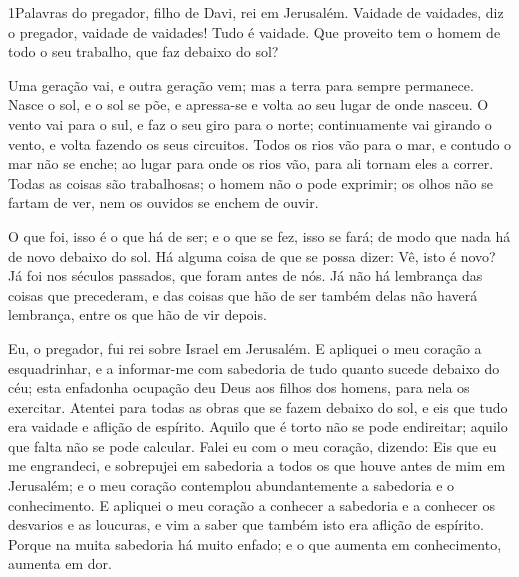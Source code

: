 
\lettrine{1} Palavras do pregador, filho de Davi, rei em
Jerusalém. Vaidade de vaidades, diz o pregador, vaidade de
vaidades! Tudo é vaidade. Que proveito tem o homem de todo o seu
trabalho, que faz debaixo do sol?

Uma geração vai, e outra geração vem; mas a terra para sempre
permanece. Nasce o sol, e o sol se põe, e apressa-se e volta ao
seu lugar de onde nasceu. O vento vai para o sul, e faz o seu
giro para o norte; continuamente vai girando o vento, e volta
fazendo os seus circuitos. Todos os rios vão para o mar, e
contudo o mar não se enche; ao lugar para onde os rios vão, para ali
tornam eles a correr. Todas as coisas são trabalhosas; o homem
não o pode exprimir; os olhos não se fartam de ver, nem os ouvidos
se enchem de ouvir.

O que foi, isso é o que há de ser; e o que se fez, isso se fará;
de modo que nada há de novo debaixo do sol. Há alguma coisa
de que se possa dizer: Vê, isto é novo? Já foi nos séculos passados,
que foram antes de nós. Já não há lembrança das coisas que
precederam, e das coisas que hão de ser também delas não haverá
lembrança, entre os que hão de vir depois.

Eu, o pregador, fui rei sobre Israel em Jerusalém. E
apliquei o meu coração a esquadrinhar, e a informar-me com sabedoria
de tudo quanto sucede debaixo do céu; esta enfadonha ocupação deu
Deus aos filhos dos homens, para nela os exercitar. Atentei
para todas as obras que se fazem debaixo do sol, e eis que tudo era
vaidade e aflição de espírito. Aquilo que é torto não se pode
endireitar; aquilo que falta não se pode calcular. Falei eu
com o meu coração, dizendo: Eis que eu me engrandeci, e sobrepujei
em sabedoria a todos os que houve antes de mim em Jerusalém; e o meu
coração contemplou abundantemente a sabedoria e o conhecimento.
E apliquei o meu coração a conhecer a sabedoria e a conhecer
os desvarios e as loucuras, e vim a saber que também isto era
aflição de espírito. Porque na muita sabedoria há muito
enfado; e o que aumenta em conhecimento, aumenta em dor.

\medskip

